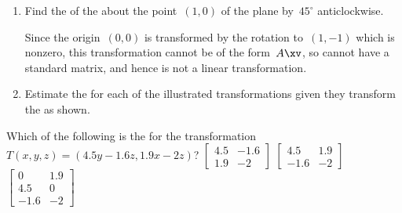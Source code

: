 \begin{example}
\begin{enumerate}[ref=\ref{eg:stmatlt}(\alph*)]
\item Find the  of the  about the point~\((1,0)\) of the plane by~\(45^\circ\) anticlockwise.
\begin{solution} 
Since the origin~\((0,0)\) is transformed by the rotation to~\((1,-1)\) which is nonzero, this transformation cannot be of the form~\(A\xv\), so cannot have a standard matrix, and hence is not a linear transformation.
\end{solution}


\item Estimate the  for each of the illustrated transformations given they transform the  as shown.
\def\unithousesize{footnotesize,grid}
\newcommand{\TwoDmat}[4]{\TwoD{#1}{#2}{#3}{#4}
\\\emph{Solution:} Here \(T(1,0)\approx(#1,#3)\) and \(T(0,1)\approx(#2,#4)\) so the approximate standard matrix is \(\begin{bmat} #1&#2\\#3&#4 \end{bmat}\).}

\end{enumerate}
\end{example}




\begin{activity}
Which of the following is the  for the transformation \(T(x,y,z)=(4.5y-1.6z,1.9x-2z)\)?
{\(\begin{bmatrix} 4.5&-1.6\\1.9&-2 \end{bmatrix}\)}
{\(\begin{bmatrix} 4.5&1.9\\-1.6&-2 \end{bmatrix}\)}
{\(\begin{bmatrix} 0&1.9\\4.5&0\\-1.6&-2 \end{bmatrix}\)}
\end{activity}




